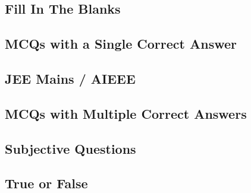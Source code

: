 \subsection*{Fill In The Blanks}
\begin{enumerate}[label=\thechapter.\arabic*,ref=\thechapter.\theenumi]




\end{enumerate}
\subsection*{MCQs with a Single Correct Answer}
\begin{enumerate}[label=\thechapter.\arabic*,ref=\thechapter.\theenumi]






\end{enumerate}
\subsection*{JEE Mains / AIEEE}
\begin{enumerate}[label=\thechapter.\arabic*,ref=\thechapter.\theenumi]





\end{enumerate}
\subsection*{MCQs with Multiple Correct Answers}
\begin{enumerate}[label=\thechapter.\arabic*,ref=\thechapter.\theenumi]




\end{enumerate}
\subsection*{Subjective Questions}
\begin{enumerate}[label=\thechapter.\arabic*,ref=\thechapter.\theenumi]




\end{enumerate}
\subsection*{True or False}
\begin{enumerate}[label=\thechapter.\arabic*,ref=\thechapter.\theenumi]




\end{enumerate}
